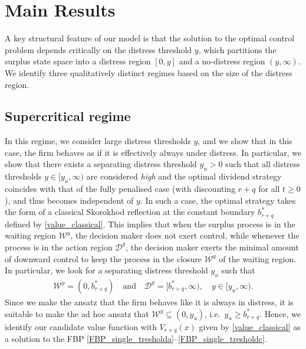 \documentclass[11pt]{article} %
\numberwithin{komcounter}{section}
\numberwithin{equation}{section}
\numberwithin{theorem}{section}
\begin{document}
\section{Main Results} 
\label{sec:results}

A key structural feature of our model is that the solution to the optimal control problem depends critically on the distress threshold $y$, which partitions the surplus state space into a distress region $[0,y]$ and a no-distress region $(y,\infty)$. 
We identify three qualitatively distinct regimes based on the size of the distress region. 


\subsection{Supercritical regime} \label{sec:supercritical}

In this regime, we consider large distress thresholds $y$, and we show that in this case, the firm behaves as if it is effectively always under distress. 
In particular, we show that there exists a separating distress threshold $y_u > 0$ such that all distress thresholds $y \in [y_u, \infty)$ are considered {\it high} and the optimal dividend strategy coincides with that of the fully penalised case (with discounting $r+q$ for all $t \geq 0$), and thus becomes independent of $y$. 
In such a case, the optimal strategy takes the form of a classical Skorokhod reflection at the constant boundary $b_{r+q}^*$ defined by \eqref{value_classical}. 
This implies that when the surplus process is in the waiting region $\mathcal{W}^y$, the decision maker does not exert control, while whenever the process is in the action region $\mathcal{D}^y$, the decision maker exerts the minimal amount of downward control to keep the process in the closure $\overline{\mathcal{W}^y}$ of the waiting region. 
In particular, we look for a separating distress threshold $y_u$ such that  
\begin{align}\label{regions_low_y}
\mathcal{W}^y = (0,b_{r+q}^*)
\quad \text{and} \quad 
\mathcal{D}^y = [b_{r+q}^*, \infty), 
\quad y \in [y_u, \infty).
\end{align}
Since we make the ansatz that the firm behaves like it is always in distress, it is suitable to make the ad hoc ansatz that $\mathcal{W}^y \subseteq (0,y_u)$, i.e.~$y_u\geq b_{r+q}^*$. 
Hence, we identify our candidate value function with $V_{r+q}(x)$ given by \eqref{value_classical} as a solution to the FBP \eqref{FBP_single_tresholda}--\eqref{FBP_single_tresholdc}. 
\end{document}
